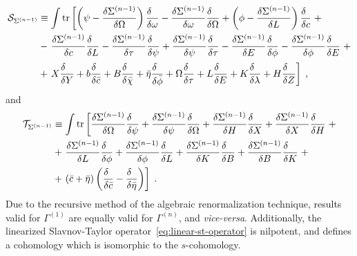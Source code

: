 \documentclass[../main.tex]{subfiles}
\begin{document}
\begin{align}
  \label{eq:linear-st-operator}
  \mathcal{S}_{\Sigma^{ (n-1) }} & \equiv \int \tr \left[\left(\psi-\frac{\delta\Sigma^{ (n-1) }}{\delta\Omega}\right)\frac{\delta\phantom{\omega}}{\delta \omega}-\frac{\delta\Sigma^{ (n-1) }}{\delta \omega}\frac{\delta\phantom{\Omega}}{\delta \Omega}+\left(\phi-\frac{\delta\Sigma^{ (n-1) }}{\delta L}\right)\frac{\delta\phantom{c}}{\delta c} \right. + \nonumber                                                                                                 \\
                                 & - \left. \frac{\delta\Sigma^{ (n-1) }}{\delta c}\frac{\delta\phantom{L}}{\delta L}-\frac{\delta\Sigma^{ (n-1) }}{\delta\tau}\frac{\delta\phantom{\psi}}{\delta\psi}+\frac{\delta\Sigma^{ (n-1) }}{\delta \psi}\frac{\delta\phantom{\tau}}{\delta \tau}-\frac{\delta\Sigma^{ (n-1) }}{\delta E}\frac{\delta\phantom{\phi}}{\delta\phi} - \frac{\delta\Sigma^{ (n-1) }}{\delta \phi}\frac{\delta\phantom{E}}{\delta E} \right. + \nonumber \\
                                 & + \left. X\frac{\delta\phantom{Y}}{\delta Y}+b\frac{\delta\phantom{\bar{c}}}{\delta\bar{c}}+B\frac{\delta\phantom{\bar{\chi}}}{\delta\bar{\chi}}+\bar{\eta}\frac{\delta\phantom{\bar{\phi}}}{\delta\bar{\phi}}+\Omega\frac{\delta\phantom{\tau}}{\delta\tau}+L\frac{\delta\phantom{E}}{\delta E}+K\frac{\delta\phantom{\lambda}}{\delta\lambda}+H\frac{\delta\phantom{Z}}{\delta Z}\right]\;,
\end{align}
and
\begin{align}
  \label{eq:linear-t-operator}
  \mathcal{T}_{\Sigma^{ (n-1) }} & \equiv \int \tr \left[\frac{\delta\Sigma^{ (n-1) }}{\delta \Omega}\frac{\delta\phantom{\psi}}{\delta \psi} + \frac{\delta\Sigma^{ (n-1) }}{\delta\psi}\frac{\delta\phantom{\Omega}}{\delta \Omega} + \frac{\delta\Sigma^{ (n-1) }}{\delta H}\frac{\delta\phantom{X}}{\delta X} + \frac{\delta\Sigma^{ (n-1) }}{\delta X}\frac{\delta\phantom{H}}{\delta H} \right. + \nonumber \\
                                 & + \left.\frac{\delta\Sigma^{ (n-1) }}{\delta L}\frac{\delta\phantom{\phi}}{\delta \phi} + \frac{\delta\Sigma^{ (n-1) }}{\delta \phi}\frac{\delta\phantom{L}}{\delta L} + \frac{\delta\Sigma^{ (n-1) }}{\delta K}\frac{\delta\phantom{B}}{\delta B} + \frac{\delta\Sigma^{ (n-1) }}{\delta B}\frac{\delta\phantom{K}}{\delta K} \right. + \nonumber                             \\
                                 & +\left.\left(\bar{c}+\bar{\eta}\right)\left(\frac{\delta\phantom{\bar{c}}}{\delta\bar{c}}-\frac{\delta\phantom{\bar{\eta}}}{\delta\bar{\eta}}\right)\right] \;.
\end{align}
Due to the recursive method of the algebraic renormalization technique, results valid for $ \Gamma^{ (1) } $ are equally valid for $ \Gamma^{ (n) } $, and \textit{vice-versa}. Additionally, the linearized Slavnov-Taylor operator~\eqref{eq:linear-st-operator} is nilpotent, and defines a cohomology which is isomorphic to the $ s $-cohomology.
\end{document}
